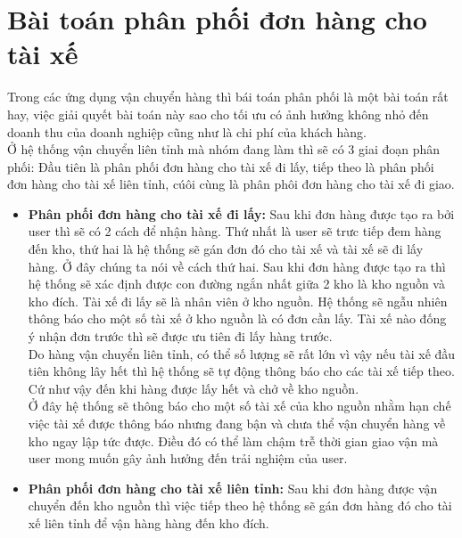 		\section{Bài toán phân phối đơn hàng cho tài xế }
		    Trong các ứng dụng vận chuyển hàng thì bái toán phân phối là một bài toán rất hay, việc giải quyết bài toán này sao cho tối ưu có ảnh hưởng không nhỏ đến doanh thu của doanh nghiệp cũng như là chi phí của khách hàng.\\
		    
		    Ở hệ thống vận chuyển liên tỉnh mà nhóm đang làm thì sẽ có 3 giai đoạn phân phối: Đầu tiên là phân phối đơn hàng cho tài xế đi lấy, tiếp theo là phân phối đơn hàng cho tài xế liên tỉnh, cúôi cùng là phân phôi đơn hàng cho tài xế đi giao.
		    
		     \begin{itemize}
                \item \textbf{Phân phối đơn hàng cho tài xế đi lấy:} Sau khi đơn hàng được tạo ra bởi user thì sẽ có 2 cách để nhận hàng. Thứ nhất là user sẽ trưc tiếp đem hàng đến kho, thứ hai là hệ thống sẽ gán đơn đó cho tài xế và tài xế sẽ đi lấy hàng. Ở đây chúng ta nói về cách thứ hai. Sau khi đơn hàng được tạo ra thì hệ thống sẽ xác định được con đường ngắn nhất giữa 2 kho là kho nguồn và kho đích. Tài xế đi lấy sẽ là nhân viên ở kho nguồn. Hệ thống sẽ ngẫu nhiên thông báo cho một số tài xế ở kho nguồn là có đơn cần lấy. Tài xế nào đống ý nhận đơn trước thì sẽ được ưu tiên đi lấy hàng trước.\\
                
                Do hàng vận chuyển liên tỉnh, có thể số lượng sẽ rất lớn vì vậy nếu tài xế đầu tiên không lây hết thì hệ thống sẽ tự động thông báo cho các tài xế tiếp theo. Cứ như vậy đến khi hàng được lấy hết và chở về kho nguồn.\\
                
                Ở đây hệ thống sẽ thông báo cho một số tài xế của kho nguồn nhằm hạn chế việc tài xế được thông báo nhưng đang bận và chưa thể vận chuyển hàng về kho ngay lập tức được. Điều đó có thể làm chậm trễ thời gian giao vận mà user mong muốn gây ảnh hưởng đến trải nghiệm của user.
            
                \item \textbf{Phân phối đơn hàng cho tài xế  liên tỉnh:} Sau khi đơn hàng được vận chuyển đến kho nguồn thì việc tiếp theo hệ thống sẽ gán đơn hàng đó cho tài xế liên tỉnh để vận hàng hàng đến kho đích.\\
                

\end{itemize}
